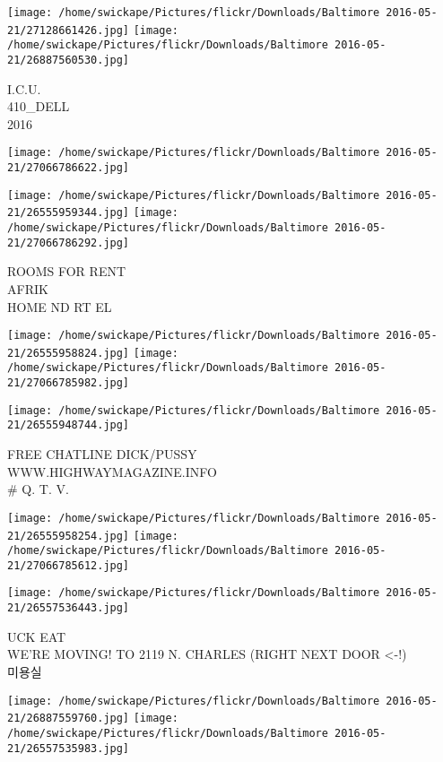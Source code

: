 \documentclass[10pt,letterpaper]{article}
\begin{document}
\vspace{0.25in}
\texttt{[image: /home/swickape/Pictures/flickr/Downloads/Baltimore 2016-05-21/27128661426.jpg]}
\texttt{[image: /home/swickape/Pictures/flickr/Downloads/Baltimore 2016-05-21/26887560530.jpg]}

I.C.U.\\
410\_DELL\\
2016
\pagebreak

\texttt{[image: /home/swickape/Pictures/flickr/Downloads/Baltimore 2016-05-21/27066786622.jpg]}

\vspace{0.25in}
\texttt{[image: /home/swickape/Pictures/flickr/Downloads/Baltimore 2016-05-21/26555959344.jpg]}
\texttt{[image: /home/swickape/Pictures/flickr/Downloads/Baltimore 2016-05-21/27066786292.jpg]}

ROOMS FOR RENT\\
AFRIK\\
HOME ND RT EL
\pagebreak

\texttt{[image: /home/swickape/Pictures/flickr/Downloads/Baltimore 2016-05-21/26555958824.jpg]}
\texttt{[image: /home/swickape/Pictures/flickr/Downloads/Baltimore 2016-05-21/27066785982.jpg]}

\vspace{0.25in}
\texttt{[image: /home/swickape/Pictures/flickr/Downloads/Baltimore 2016-05-21/26555948744.jpg]}

FREE CHATLINE DICK/PUSSY\\
WWW.HIGHWAYMAGAZINE.INFO\\
\# Q. T. V.
\pagebreak

\texttt{[image: /home/swickape/Pictures/flickr/Downloads/Baltimore 2016-05-21/26555958254.jpg]}
\texttt{[image: /home/swickape/Pictures/flickr/Downloads/Baltimore 2016-05-21/27066785612.jpg]}

\vspace{0.25in}
\texttt{[image: /home/swickape/Pictures/flickr/Downloads/Baltimore 2016-05-21/26557536443.jpg]}

UCK EAT\\
WE'RE MOVING!  TO 2119 N. CHARLES (RIGHT NEXT DOOR <{-}!)\\
미용실
\pagebreak

\texttt{[image: /home/swickape/Pictures/flickr/Downloads/Baltimore 2016-05-21/26887559760.jpg]}
\texttt{[image: /home/swickape/Pictures/flickr/Downloads/Baltimore 2016-05-21/26557535983.jpg]}
\end{document}
